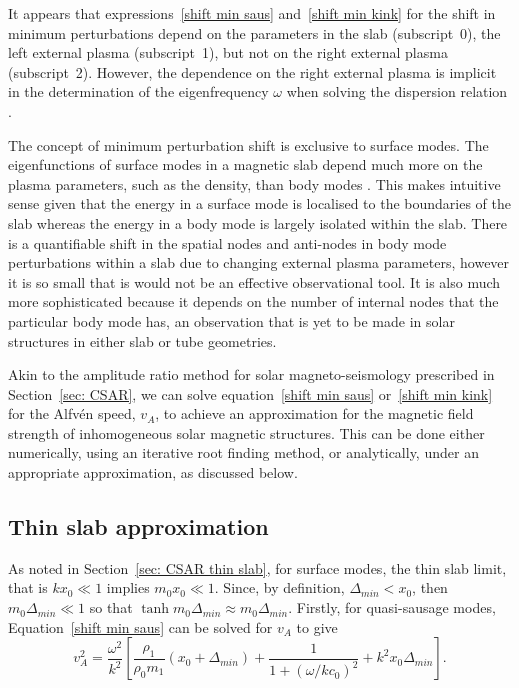 \documentclass[namedreferences]{solarphysics}
\numberwithin{equation}{section}
\begin{document}
\begin{article}
It appears that expressions~\eqref{shift min saus} and~\eqref{shift min kink} for the shift in minimum perturbations depend on the parameters in the slab (subscript~0), the left external plasma (subscript~1), but not on the right external plasma (subscript~2). However, the dependence on the right external plasma is implicit in the determination of the eigenfrequency $\omega$ when solving the dispersion relation \citep{all_etal17}.

The concept of minimum perturbation shift is exclusive to surface modes. The eigenfunctions of surface modes in a magnetic slab depend much more on the plasma parameters, such as the density, than body modes \citep{all_etal17}. This makes intuitive sense given that the energy in a surface mode is localised to the boundaries of the slab whereas the energy in a body mode is largely isolated within the slab. There is a quantifiable shift in the spatial nodes and anti-nodes in body mode perturbations within a slab due to changing external plasma parameters, however it is so small that is would not be an effective observational tool. It is also much more sophisticated because it depends on the number of internal nodes that the particular body mode has, an observation that is yet to be made in solar structures in either slab or tube geometries.

Akin to the amplitude ratio method for solar magneto-seismology prescribed in Section~\ref{sec: CSAR}, we can solve equation~\eqref{shift min saus} or~\eqref{shift min kink} for the Alfv\'{e}n speed, $v_A$, to achieve an approximation for the magnetic field strength of inhomogeneous solar magnetic structures. This can be done either numerically, using an iterative root finding method, or analytically, under an appropriate approximation, as discussed below.


\subsection{Thin slab approximation}
As noted in Section~\ref{sec: CSAR thin slab}, for surface modes, the thin slab limit, that is $kx_0 \ll 1$ implies $m_0x_0 \ll 1$. Since, by definition, $\Delta_{min} < x_0$, then $m_0\Delta_{min} \ll 1$ so that $\tanh{m_0\Delta_{min}} \approx m_0\Delta_{min}$. Firstly, for quasi-sausage modes, Equation~\eqref{shift min saus} can be solved for $v_A$ to give
\begin{equation}
v_A^2 = \frac{\omega^2}{k^2} \left[\frac{\rho_1}{\rho_0m_1}(x_0 + \Delta_{min}) + \frac{1}{1 + (\omega / kc_0)^2} + k^2x_0\Delta_{min}\right].
\end{equation}


\end{article}
\end{document}

